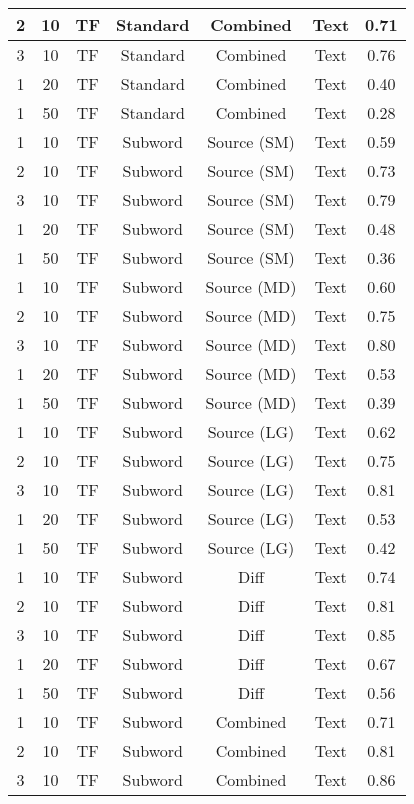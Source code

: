 \begin{longtable}{|c|c|c|c|c|c|c|}
\hline
2 & 10 & TF & Standard & Combined & Text & 0.71 \\
\hline
3 & 10 & TF & Standard & Combined & Text & 0.76 \\
\hline
1 & 20 & TF & Standard & Combined & Text & 0.40 \\
\hline
1 & 50 & TF & Standard & Combined & Text & 0.28 \\
\hline
1 & 10 & TF & Subword & Source (SM) & Text & 0.59 \\
\hline
2 & 10 & TF & Subword & Source (SM) & Text & 0.73 \\
\hline
3 & 10 & TF & Subword & Source (SM) & Text & 0.79 \\
\hline
1 & 20 & TF & Subword & Source (SM) & Text & 0.48 \\
\hline
1 & 50 & TF & Subword & Source (SM) & Text & 0.36 \\
\hline
1 & 10 & TF & Subword & Source (MD) & Text & 0.60 \\
\hline
2 & 10 & TF & Subword & Source (MD) & Text & 0.75 \\
\hline
3 & 10 & TF & Subword & Source (MD) & Text & 0.80 \\
\hline
1 & 20 & TF & Subword & Source (MD) & Text & 0.53 \\
\hline
1 & 50 & TF & Subword & Source (MD) & Text & 0.39 \\
\hline
1 & 10 & TF & Subword & Source (LG) & Text & 0.62 \\
\hline
2 & 10 & TF & Subword & Source (LG) & Text & 0.75 \\
\hline
3 & 10 & TF & Subword & Source (LG) & Text & 0.81 \\
\hline
1 & 20 & TF & Subword & Source (LG) & Text & 0.53 \\
\hline
1 & 50 & TF & Subword & Source (LG) & Text & 0.42 \\
\hline
1 & 10 & TF & Subword & Diff & Text & 0.74 \\
\hline
2 & 10 & TF & Subword & Diff & Text & 0.81 \\
\hline
3 & 10 & TF & Subword & Diff & Text & 0.85 \\
\hline
1 & 20 & TF & Subword & Diff & Text & 0.67 \\
\hline
1 & 50 & TF & Subword & Diff & Text & 0.56 \\
\hline
1 & 10 & TF & Subword & Combined & Text & 0.71 \\
\hline
2 & 10 & TF & Subword & Combined & Text & 0.81 \\
\hline
3 & 10 & TF & Subword & Combined & Text & 0.86 \\

\end{longtable}
